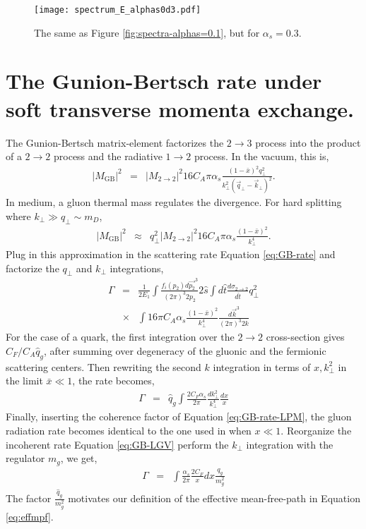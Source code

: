 \documentclass[aps, prc, reprint, amsmath, groupedaddress, nofootinbib]{revtex4-1}
\begin{document}
{\begin{appendices}
\begin{figure}
\texttt{[image: spectrum\_E\_alphas0d3.pdf]}
\caption{The same as Figure \ref{fig:spectra-alphas=0.1}, but for $\alpha_s = 0.3$.}
\label{fig:spectra-alphas=0.3}
\end{figure}
\end{appendices}
\section{The Gunion-Bertsch rate under soft transverse momenta exchange.}
\label{app:consistency}
The Gunion-Bertsch matrix-element factorizes the $2\rightarrow3$ process into the product of a $2\rightarrow2$ process and the radiative $1\rightarrow 2$ process. 
In the vacuum, this is,
\begin{eqnarray}
|M_{\textrm{GB}}|^2 &=& |M_{2\rightarrow 2}|^2 16 C_A \pi \alpha_s \frac{(1-\bar{x})^2q_\perp^2}{k_\perp^2\left(\vec{q}_\perp-\vec{k}_\perp\right)^2}.
\end{eqnarray}
In medium, a gluon thermal mass regulates the divergence. 
For hard splitting where $k_\perp \gg q_\perp \sim m_D$, 
\begin{eqnarray}
|M_{\textrm{GB}}|^2 &\approx & q_\perp^2 |M_{2\rightarrow 2}|^2 16 C_A \pi \alpha_s \frac{(1-\bar{x})^2}{k_\perp^4}.
\end{eqnarray}
Plug in this approximation in the scattering rate Equation \ref{eq:GB-rate} and factorize the $q_\perp$ and $k_\perp$ integrations,
\begin{eqnarray}
\Gamma &=& \frac{1}{2E_1}\int\frac{f_i(p_2)d\vec{p_2}^3}{(2\pi)^3 2p_2}2\hat{s}\int d\hat{t}\frac{d\sigma_{2\rightarrow 2}}{d\hat{t}}q_\perp^2
\nonumber \\
&\times& \int 16\pi C_A \alpha_s \frac{(1-\bar{x})^2}{k_\perp^4} \frac{d\vec{k}^3}{(2\pi)^3 2k}
\end{eqnarray}
For the case of a quark, the first integration over the $2\rightarrow 2$ cross-section gives $C_F/C_A\hat{q}_g$, after summing over degeneracy of the gluonic and the fermionic scattering centers.
Then rewriting the second $k$ integration in terms of $x, k_\perp^2$ in the limit $\bar{x}\ll 1$, the rate becomes,
\begin{eqnarray}\label{eq:GB-LGV}
\Gamma &=& \hat{q}_g \int \frac{2C_F\alpha_s}{2\pi} \frac{dk_\perp^2}{k_\perp^4} \frac{dx}{x}
\end{eqnarray}
Finally, inserting the coherence factor of Equation \ref{eq:GB-rate-LPM}, the gluon radiation rate becomes identical to the one used in \cite{Cao:2013ita} when $x\ll 1$.
Reorganize the incoherent rate Equation \ref{eq:GB-LGV} perform the $k_\perp$ integration with the regulator $m_g$, we get,
\begin{eqnarray}
\Gamma &=& \int \frac{\alpha_s}{2\pi} \frac{2C_F}{x}dx \frac{q_g}{m_g^2} 
\end{eqnarray}
The factor $\frac{\hat{q}_g}{m_g^2}$ motivates our definition of the effective mean-free-path in Equation \ref{eq:effmpf}.

}
\end{document}
